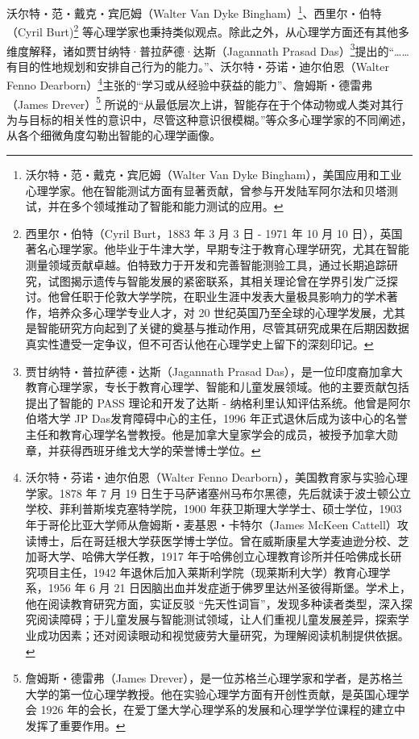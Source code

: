 沃尔特・范・戴克・宾厄姆（Walter Van Dyke Bingham）\footnote{沃尔特・范・戴克・宾厄姆（Walter Van Dyke Bingham），美国应用和工业心理学家。他在智能测试方面有显著贡献，曾参与开发陆军阿尔法和贝塔测试，并在多个领域推动了智能和能力测试的应用。}、西里尔・伯特（Cyril Burt)\footnote{西里尔・伯特（Cyril Burt，1883 年 3 月 3 日 - 1971 年 10 月 10 日），英国著名心理学家。他毕业于牛津大学，早期专注于教育心理学研究，尤其在智能测量领域贡献卓越。伯特致力于开发和完善智能测验工具，通过长期追踪研究，试图揭示遗传与智能发展的紧密联系，其相关理论曾在学界引发广泛探讨。他曾任职于伦敦大学学院，在职业生涯中发表大量极具影响力的学术著作，培养众多心理学专业人才，对 20 世纪英国乃至全球的心理学发展，尤其是智能研究方向起到了关键的奠基与推动作用，尽管其研究成果在后期因数据真实性遭受一定争议，但不可否认他在心理学史上留下的深刻印记。} 等心理学家也秉持类似观点。除此之外，从心理学方面还有其他多维度解释，诸如贾甘纳特·普拉萨德·达斯（Jagannath Prasad Das）\footnote{贾甘纳特・普拉萨德・达斯（Jagannath Prasad Das），是一位印度裔加拿大教育心理学家，专长于教育心理学、智能和儿童发展领域。他的主要贡献包括提出了智能的 PASS 理论和开发了达斯 - 纳格利里认知评估系统。他曾是阿尔伯塔大学 JP Das发育障碍中心的主任，1996 年正式退休后成为该中心的名誉主任和教育心理学名誉教授。他是加拿大皇家学会的成员，被授予加拿大勋章，并获得西班牙维戈大学的荣誉博士学位。}提出的“……有目的性地规划和安排自己行为的能力。”、沃尔特・芬诺・迪尔伯恩（Walter Fenno Dearborn）\footnote{沃尔特・芬诺・迪尔伯恩（Walter Fenno Dearborn），美国教育家与实验心理学家。1878 年 7 月 19 日生于马萨诸塞州马布尔黑德，先后就读于波士顿公立学校、菲利普斯埃克塞特学院，1900 年获卫斯理大学学士、硕士学位，1903 年于哥伦比亚大学师从詹姆斯・麦基恩・卡特尔（James McKeen Cattell）攻读博士，后在哥廷根大学获医学博士学位。曾在威斯康星大学麦迪逊分校、芝加哥大学、哈佛大学任教，1917 年于哈佛创立心理教育诊所并任哈佛成长研究项目主任，1942 年退休后加入莱斯利学院（现莱斯利大学）教育心理学系，1956 年 6 月 21 日因脑出血并发症逝于佛罗里达州圣彼得斯堡。学术上，他在阅读教育研究方面，实证反驳 “先天性词盲”，发现多种读者类型，深入探究阅读障碍；于儿童发展与智能测试领域，让人们重视儿童发展差异，探索学业成功因素；还对阅读眼动和视觉疲劳大量研究，为理解阅读机制提供依据。}主张的“学习或从经验中获益的能力”、詹姆斯・德雷弗（James Drever）\footnote{詹姆斯・德雷弗（James Drever），是一位苏格兰心理学家和学者，是苏格兰大学的第一位心理学教授。他在实验心理学方面有开创性贡献，是英国心理学会 1926 年的会长，在爱丁堡大学心理学系的发展和心理学学位课程的建立中发挥了重要作用。} 所说的“从最低层次上讲，智能存在于个体动物或人类对其行为与目标的相关性的意识中，尽管这种意识很模糊。”等众多心理学家的不同阐述，从各个细微角度勾勒出智能的心理学画像。

